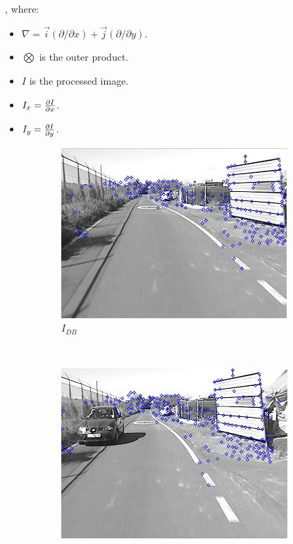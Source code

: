 , where:

\begin{itemize}
 \item $\nabla = \vec{i} (\partial / \partial x) + \vec{j} (\partial / \partial y)$.
 \item $\bigotimes$ is the outer product.
 \item $I$ is the processed image.
 \item $I_x = {{\partial I} \over {\partial x}}$.
 \item $I_y = {{\partial I} \over {\partial y}}$.
\end{itemize}

\begin{figure}[h!]
        \centering
        \begin{subfigure}[b]{0.45\textwidth}
                \centering
                \includegraphics[width=\textwidth]{featuresShi1}
                \caption{$I_{DB}$}\label{fig:cp01_features_shi_1}
        \end{subfigure}%
        ~ %
        \begin{subfigure}[b]{0.45\textwidth}
                \centering
                \includegraphics[width=\textwidth]{featuresShi2}

\end{subfigure}
\end{figure}
